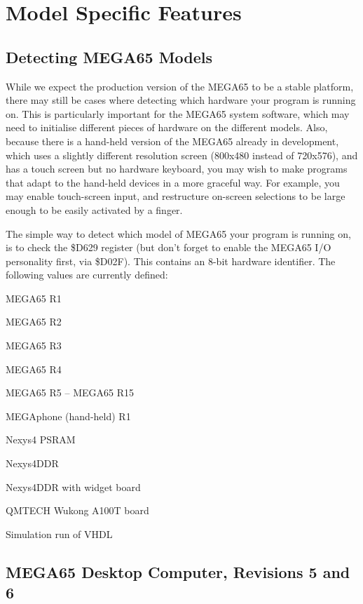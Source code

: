 \chapter{Model Specific Features}

\section{Detecting MEGA65 Models}

While we expect the production version of the MEGA65 to be a stable platform, there may still be
cases where detecting which hardware your program is running on. This is particularly important
for the MEGA65 system software, which may need to initialise different pieces of hardware on the
different models.  Also, because there is a hand-held version of the MEGA65 already  in development,
which uses a slightly different resolution screen (800x480 instead of 720x576), and has a touch
screen but no hardware keyboard, you may wish to make programs that adapt to the hand-held
devices in a more graceful way. For example, you may enable touch-screen input, and restructure
on-screen selections to be large enough to be easily activated by a finger.

The simple way to detect which model of MEGA65 your program is running on, is to check the
\$D629 register (but don't forget to enable the MEGA65 I/O personality first, via \$D02F).
This contains an 8-bit hardware identifier.  The following values are currently defined:

\begin{description}[align=left,labelwidth=0.2cm]
\item[\$01 (1)] MEGA65 R1
\item[\$02 (2)] MEGA65 R2
\item[\$03 (3)] MEGA65 R3
\item[\$04 (4)] MEGA65 R4
\item[\$05 -- \$0F (5 -- 15)] MEGA65 R5 -- MEGA65 R15
\item[\$21 (33)] MEGAphone (hand-held) R1
\item[\$40 (64)] Nexys4 PSRAM
\item[\$41 (65)] Nexys4DDR
\item[\$42 (66)] Nexys4DDR with widget board
\item[\$FD (253)] QMTECH Wukong A100T board
\item[\$FE (254)] Simulation run of VHDL
\end{description}


\section{MEGA65 Desktop Computer, Revisions 5 and 6}

